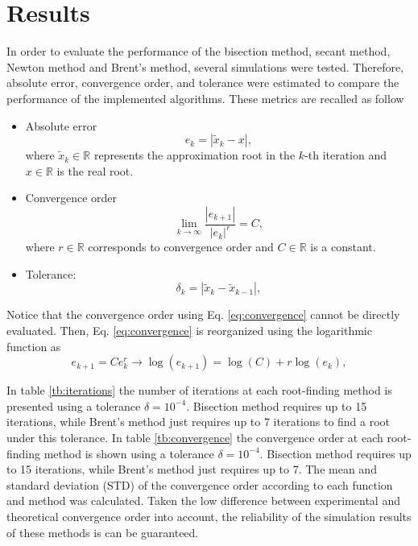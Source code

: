 \documentclass[11pt]{exam}
\begin{document}
\section{Results}
In order to evaluate the performance of the bisection method, secant method, Newton method and Brent's method, several simulations were tested. Therefore, absolute error, convergence order, and tolerance were estimated to compare the performance of the implemented algorithms. These metrics are recalled as follow


\begin{itemize}
	\item Absolute error
	\begin{equation}\label{eq:absolute}
	e_k=\left | \tilde{x}_k-x \right |,
	\end{equation}
	where $\tilde{x}_k\in\mathbb{R}$ represents the approximation root in the $k$-th iteration and $x\in\mathbb{R}$ is the real root.
	\item Convergence order
	\begin{equation}\label{eq:convergence}
	\lim_{k\rightarrow \infty }\frac{\left | e_{k+1} \right |}{\left | e_k \right |^r}=C,
	\end{equation}
	where $r\in\mathbb{R}$ corresponds to convergence order and $C\in\mathbb{R}$ is a constant.
	\item Tolerance:
	\begin{equation}\label{eq:tolerance}
	\delta_k=\left | \tilde{x}_k-\tilde{x}_{k-1} \right |,
	\end{equation}
\end{itemize}

Notice that the convergence order using Eq. \ref{eq:convergence} cannot be directly evaluated. Then, Eq. \ref{eq:convergence} is reorganized using the logarithmic function as
\begin{equation}\label{eq:ratio}
e_{k+1}=Ce_k^r\rightarrow \log(e_{k+1})=\log(C)+r\log(e_k),
\end{equation}

In table \ref{tb:iterations} the number of iterations at each root-finding method is presented using a tolerance $\delta=10^{-4}$. Bisection method requires up to 15 iterations, while Brent's method just requires up to 7 iterations to find a root under this tolerance. In table \ref{tb:convergence} the convergence order at each root-finding method is shown using a tolerance $\delta=10^{-4}$. Bisection method requires up to 15 iterations, while Brent's method just requires up to 7. The mean and standard deviation (STD) of the convergence order according to each function and method was calculated. Taken the low difference between experimental and theoretical convergence order into account, the reliability of the simulation results of these methods is can be guaranteed.
\end{document}
